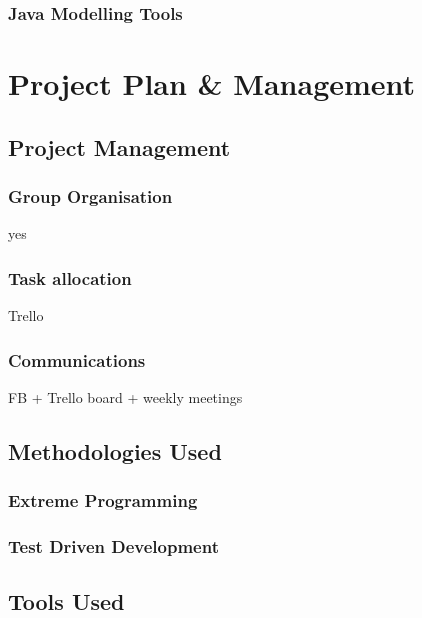 \documentclass[a4paper]{article}
\begin{document}
\subsubsection{Java Modelling Tools}

\section{Project Plan & Management}

\subsection{Project Management}%

\subsubsection{Group Organisation}

yes

\subsubsection{Task allocation}

Trello

\subsubsection{Communications}

FB + Trello board + weekly meetings

\subsection{Methodologies Used}%

\subsubsection{Extreme Programming}

\subsubsection{Test Driven Development}

\subsection{Tools Used}%
\end{document}
